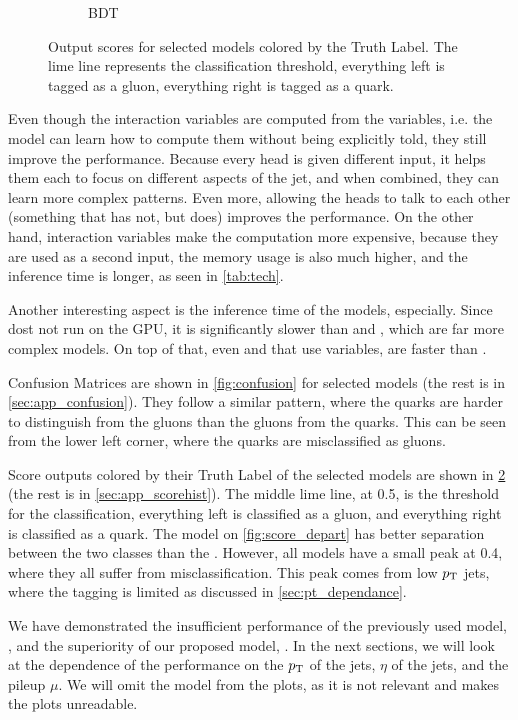 \begin{figure}[ht]
\begin{subfigure}[b]{0.49\textwidth}
        \caption{BDT}
        \label{fig:score_bdt}
    \end{subfigure}
    \caption{Output scores for selected models colored by the Truth Label. The lime line represents the classification threshold, everything left is tagged as a gluon, everything right is tagged as a quark.}
    \label{fig:score}
\end{figure}

Even though the interaction variables are computed from the \PFO variables, i.e. the model can learn how to compute them without being explicitly told, they still improve the performance.
Because every head is given different input, it helps them each to focus on different aspects of the jet, and when combined, they can learn more complex patterns.
Even more, allowing the heads to talk to each other (something that \ParT has not, but \depart does) improves the performance.
On the other hand, interaction variables make the computation more expensive, because they are used as a second input, the memory usage is also much higher, and the inference time is longer, as seen in \cref{tab:tech}.


Another interesting aspect is the inference time of the models, \bdt especially. 
Since \bdt dost not run on the GPU, it is significantly slower than \highway and \fc, which are far more complex models.
On top of that, even \EFN and \PFN that use \FPO variables, are faster than \bdt.

Confusion Matrices are shown in \cref{fig:confusion} for selected models (the rest is in \cref{sec:app_confusion}).
They follow a similar pattern, where the quarks are harder to distinguish from the gluons than the gluons from the quarks.
This can be seen from the lower left corner, where the quarks are misclassified as gluons.

Score outputs colored by their Truth Label of the selected models are shown in \cref{fig:score} (the rest is in \cref{sec:app_scorehist}).
The middle lime line, at 0.5, is the threshold for the classification, everything left is classified as a gluon, and everything right is classified as a quark.
The \depart model on \cref{fig:score_depart} has better separation between the two classes than the \bdt.
However, all models have a small peak at 0.4, where they all suffer from misclassification.
This peak comes from low $p_\text{T}$ jets, where the tagging is limited as discussed in \cref{sec:pt_dependance}.

We have demonstrated the insufficient performance of the previously used model, \bdt, and the superiority of our proposed model, \depart.
In the next sections, we will look at the dependence of the performance on the $p_\text{T}$ of the jets, $\eta$ of the jets, and the pileup $\mu$.
We will omit the \bdt model from the plots, as it is not relevant and makes the plots unreadable.

